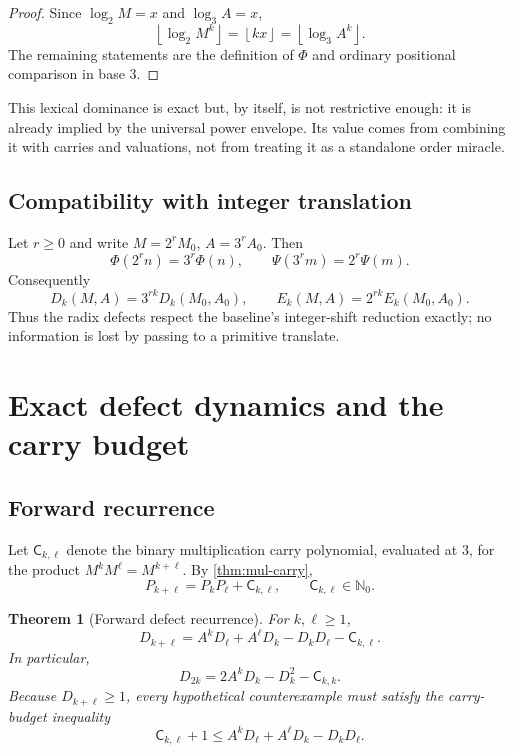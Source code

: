 \documentclass[11pt]{article}
\newtheorem{theorem}{Theorem}[section]
\theoremstyle{definition}
\theoremstyle{remark}
\newcommand{\Nzero}{\mathbb N_0}
\newcommand{\floor}[1]{\left\lfloor #1\right\rfloor}
\newcommand{\PhiMap}{\Phi}
\newcommand{\PsiMap}{\Psi}
\newcommand{\carry}{\mathsf C}
\begin{document}
\begin{proof}
Since $\log_2M=x$ and $\log_3A=x$,
\[
 \floor{\log_2M^k}=\floor{kx}=\floor{\log_3A^k}.
\]
The remaining statements are the definition of $\PhiMap$ and ordinary
positional comparison in base $3$.
\end{proof}

This lexical dominance is exact but, by itself, is not restrictive enough:
it is already implied by the universal power envelope.  Its value comes from
combining it with carries and valuations, not from treating it as a standalone
order miracle.

\subsection{Compatibility with integer translation}

Let $r\ge0$ and write $M=2^rM_0$, $A=3^rA_0$.  Then
\[
  \PhiMap(2^rn)=3^r\PhiMap(n),
  \qquad
  \PsiMap(3^rm)=2^r\PsiMap(m).
\]
Consequently
\[
 D_k(M,A)=3^{rk}D_k(M_0,A_0),
 \qquad
 E_k(M,A)=2^{rk}E_k(M_0,A_0).
\]
Thus the radix defects respect the baseline's integer-shift reduction exactly;
no information is lost by passing to a primitive translate.

\section{Exact defect dynamics and the carry budget}

\subsection{Forward recurrence}

Let $\carry_{k,\ell}$ denote the binary multiplication carry polynomial,
evaluated at $3$, for the product $M^kM^\ell=M^{k+\ell}$.  By
\cref{thm:mul-carry},
\[
  P_{k+\ell}=P_kP_\ell+\carry_{k,\ell},
  \qquad \carry_{k,\ell}\in\Nzero.
\]

\begin{theorem}[Forward defect recurrence]\label{thm:D-recurrence}
For $k,\ell\ge1$,
\begin{equation}\label{eq:D-recurrence}
 \boxed{
 D_{k+\ell}
 =A^kD_\ell+A^\ell D_k-D_kD_\ell-\carry_{k,\ell}.}
\end{equation}
In particular,
\begin{equation}\label{eq:D-square}
 D_{2k}=2A^kD_k-D_k^2-\carry_{k,k}.
\end{equation}
Because $D_{k+\ell}\ge1$, every hypothetical counterexample must satisfy the
carry-budget inequality
\begin{equation}\label{eq:carry-budget}
 \carry_{k,\ell}+1
 \le A^kD_\ell+A^\ell D_k-D_kD_\ell.
\end{equation}
\end{theorem}
\end{document}
